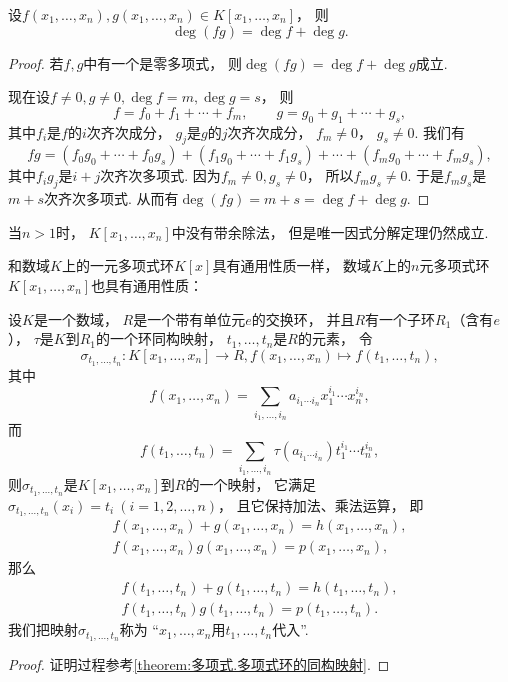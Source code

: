 \begin{theorem}
设\(f(x_1,\dotsc,x_n),g(x_1,\dotsc,x_n) \in K[x_1,\dotsc,x_n]\)，
则\begin{equation}
	\deg(fg)=\deg f+\deg g.
\end{equation}
\begin{proof}
若\(f,g\)中有一个是零多项式，
则\(\deg(fg)=\deg f+\deg g\)成立.

现在设\(f\neq0,g\neq0,\deg f=m,\deg g=s\)，
则\[
	f=f_0+f_1+\dotsb+f_m, \qquad
	g=g_0+g_1+\dotsb+g_s,
\]
其中\(f_i\)是\(f\)的\(i\)次齐次成分，
\(g_j\)是\(g\)的\(j\)次齐次成分，
\(f_m\neq0\)，
\(g_s\neq0\).
我们有\[
	fg
	=(f_0 g_0+\dotsb+f_0 g_s)
	+(f_1 g_0+\dotsb+f_1 g_s)
	+\dotsb
	+(f_m g_0+\dotsb+f_m g_s),
\]
其中\(f_i g_j\)是\(i+j\)次齐次多项式.
因为\(f_m\neq0,g_s\neq0\)，
所以\(f_m g_s\neq0\).
于是\(f_m g_s\)是\(m+s\)次齐次多项式.
从而有\(\deg(fg)=m+s=\deg f+\deg g\).
\end{proof}
\end{theorem}

\begin{remark}
当\(n>1\)时，
\(K[x_1,\dotsc,x_n]\)中没有带余除法，
但是唯一因式分解定理仍然成立.
\end{remark}

和数域\(K\)上的一元多项式环\(K[x]\)具有通用性质一样，
数域\(K\)上的\(n\)元多项式环\(K[x_1,\dotsc,x_n]\)也具有通用性质：
\begin{theorem}
设\(K\)是一个数域，
\(R\)是一个带有单位元\(e\)的交换环，
并且\(R\)有一个子环\(R_1\)（含有\(e\)），
\(\tau\)是\(K\)到\(R_1\)的一个环同构映射，
\(t_1,\dotsc,t_n\)是\(R\)的元素，
令\[
	\sigma_{t_1,\dotsc,t_n}
	\colon
	K[x_1,\dotsc,x_n] \to R,
	f(x_1,\dotsc,x_n) \mapsto f(t_1,\dotsc,t_n),
\]
其中\[
	f(x_1,\dotsc,x_n)
	= \sum_{i_1,\dotsc,i_n}
	a_{i_1 \dotsm i_n}
	x_1^{i_1} \dotsm x_n^{i_n},
\]
而\[
	f(t_1,\dotsc,t_n)
	= \sum_{i_1,\dotsc,i_n}
	\tau(a_{i_1 \dotsm i_n})
	t_1^{i_1} \dotsm t_n^{i_n},
\]
则\(\sigma_{t_1,\dotsc,t_n}\)是\(K[x_1,\dotsc,x_n]\)到\(R\)的一个映射，
它满足\(\sigma_{t_1,\dotsc,t_n}(x_i)=t_i\ (i=1,2,\dotsc,n)\)，
且它保持加法、乘法运算，
即\begin{gather*}
	f(x_1,\dotsc,x_n)
	+g(x_1,\dotsc,x_n)
	=h(x_1,\dotsc,x_n), \\
	f(x_1,\dotsc,x_n)
	g(x_1,\dotsc,x_n)
	=p(x_1,\dotsc,x_n),
\end{gather*}
那么\begin{gather*}
	f(t_1,\dotsc,t_n)
	+g(t_1,\dotsc,t_n)
	=h(t_1,\dotsc,t_n), \\
	f(t_1,\dotsc,t_n)
	g(t_1,\dotsc,t_n)
	=p(t_1,\dotsc,t_n).
\end{gather*}
\rm
我们把映射\(\sigma_{t_1,\dotsc,t_n}\)称为
“\(x_1,\dotsc,x_n\)用\(t_1,\dotsc,t_n\)代入”.
\begin{proof}
证明过程参考\cref{theorem:多项式.多项式环的同构映射}.
\end{proof}
\end{theorem}


